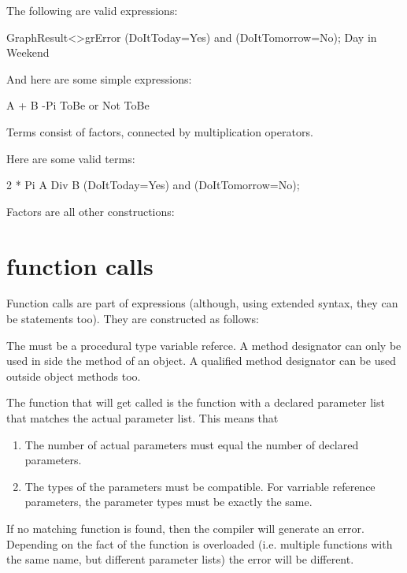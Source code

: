 \documentclass{report}
\begin{document}
The following are valid expressions:
\begin{listing}
GraphResult<>grError
(DoItToday=Yes) and (DoItTomorrow=No);   
Day in Weekend
\end{listing}
And here are some simple expressions:
\begin{listing}
A + B
-Pi
ToBe or Not ToBe
\end{listing}

Terms consist of factors, connected by multiplication operators.



Here are some valid terms:
\begin{listing}
2 * Pi
A Div B
(DoItToday=Yes) and (DoItTomorrow=No);   
\end{listing}

Factors are all other constructions:



\section{function calls}

Function calls are part of expressions (although, using extended syntax,
they can be statements too). They are constructed as follows:



The  must be a procedural type variable referce.
A method designator can only be used in side the method of an object. A
qualified method designator can be used outside object methods too.

The function that will get called is the function with a declared parameter
list that matches the actual parameter list. This means that
\begin{enumerate}
\item The number of actual parameters must equal the number of declared
parameters.
\item The types of the parameters must be compatible. For varriable
reference parameters, the parameter types must be exactly the same. 
\end{enumerate}

If no matching function is found, then the compiler will generate an error.
Depending on the fact of the function is overloaded (i.e. multiple functions
with the same name, but different parameter lists) the error will be
different.
\end{document}
